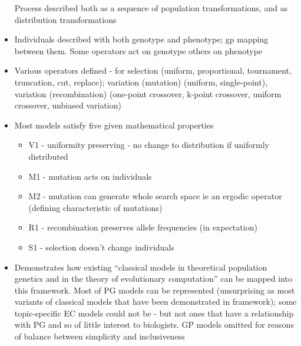 \begin{itemize}
	Process described both as a sequence of population transformations,
	and as distribution transformations
	
	\item
	
	Individuals described with both genotype and phenotype; gp mapping
	between them. Some operators act on genotype others on phenotype
	
	\item
	
	Various operators defined - for selection (uniform, proportional,
	tournament, truncation, cut, replace); variation (mutation) (uniform,
	single-point), variation (recombination) (one-point crossover, k-point
	crossover, uniform crossover, unbiased variation)
	
	\item
	
	Most models satisfy five given mathematical properties
	
	
	\begin{itemize}
		\item
		
		V1 - uniformity preserving - no change to distribution if uniformly
		distributed
		
		\item
		
		M1 - mutation acts on individuals
		
		\item
		
		M2 - mutation can generate whole search space ie an ergodic operator
		(defining characteristic of mutations)
		
		\item
		
		R1 - recombination preserves allele frequencies (in expectation)
		
		\item
		
		S1 - selection doesn't change individuals
		
	\end{itemize}
	\item
	
	Demonstrates how existing ``classical models in theoretical population
	genetics and in the theory of evolutionary computation'' can be mapped
	into this framework. Most of PG models can be represented
	(unsurprising as most variants of classical models that have been
	demonstrated in framework); some topic-specific EC models could not be
	- but not ones that have a relationship with PG and so of little
	interest to biologists. GP models omitted for reasons of balance
	between simplicity and inclusiveness
	

\end{itemize}
